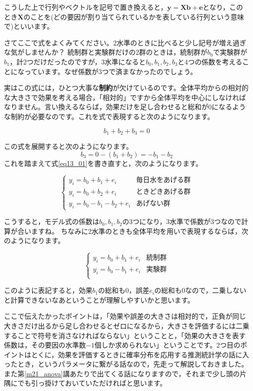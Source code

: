 \documentclass{ltjbook}
\begin{document}
こうした上で行列やベクトルを記号で置き換えると，$\bm{y} = \bm{Xb} + \bm{e}$となり，このとき$\bm{X}$のことを(どの要因が割り当てられているかを表している行列という意味で)といいます。



さてここで式をよくみてください。2水準のときに比べると少し記号が増え過ぎな気がしませんか？ 統制群と実験群だけの2群のときは，統制群が$b_0$で実験群が$b_1$，計2つだけだったのですが，3水準になると$b_0,b_1,b_2,b_3$と4つの係数を考えることになっています。なぜ係数が3つで済まなかったのでしょう。

実はこの式には，ひとつ大事な\textbf{制約}が欠けているのです。全体平均からの相対的な大きさで効果を考える場合，「相対的」ですから全体平均を中心にしなければなりません。言い換えるならば，効果だけを足し合わせると総和が0になるような制約が必要なのです。これを式で表現すると次のようになります。

\[ b_1 + b_2 + b_3 = 0 \]

この式を展開すると次のようになります。
\[ b_3 = 0 - (b_1 + b_2) = -b_1 - b_2 \]
これを踏まえて式\ref{eq13_01}を書き直すと，次のようになります。

\[
	\label{eq13_02}
	\begin{cases}
		y_i = b_0 + b_1 + e_i       & \mbox{毎日水をあげる群} \\
		y_i = b_0 + b_2 + e_i       & \mbox{ときどきあげる群} \\
		y_i = b_0 - b_1 - b_2 + e_i & \mbox{あげない群}
	\end{cases}
\]

こうすると，モデル式の係数は$b_0,b_1,b_2$の3つになり，3水準で係数が3つなので計算が合いますね。
ちなみに2水準のときも全体平均を用いで表現するならば，次のようになります。

\[
	\begin{cases}
		y_i = b_0 + b_1 + e_i & \mbox{統制群} \\
		y_i = b_0 - b_1 + e_i & \mbox{実験群} \\
	\end{cases}
\]

このように表記すると，効果$b_1$の総和も0，誤差$e_i$の総和も0なので，二乗しないと計算できないなあということが理解しやすいかと思います。

ここで伝えたかったポイントは，「効果や誤差の大きさは相対的で，正負が同じ大きさだけ出るから足し合わせるとゼロになるから，大きさを評価するには二乗することで符号を消さなければならない」ということと，「効果の大きさを表す係数は，その要因の水準数$-1$個しか求められない」ということです。2つ目のポイントはとくに，効果を評価するときに確率分布を応用する推測統計学の話に入ったとき，というパラメータに繋がる話なので，先走って解説しておきました。また第\ref{m21_anova}講あたりで出てくる話になりますので，それまで少し頭の片隅にでも引っ掛けておいていただければと思います。
\end{document}
